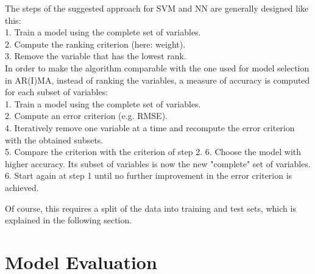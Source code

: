 \documentclass[a4paper, 11pt]{article}
\begin{document}
The steps of the suggested approach for SVM and NN are generally designed like this:\\
1. Train a model using the complete set of variables.\\
2. Compute the ranking criterion (here: weight). \\
3. Remove the variable that has the lowest rank. \\

In order to make the algorithm comparable with the one used for model selection in AR(I)MA, instead of ranking the variables, a measure of accuracy is computed for each subset of variables: \\
1. Train a model using the complete set of variables.\\
2. Compute an error criterion (e.g. RMSE). \\
4. Iteratively remove one variable at a time and recompute the error criterion with the obtained subsets. \\
5. Compare the criterion with the criterion of step 2.
6. Choose the model with higher accuracy. Its subset of variables is now the new "complete" set of variables.\\
6. Start again at step 1 until no further improvement in the error criterion is achieved.

Of course, this requires a split of the data into training and test sets, which is explained in the following section.


\section{Model Evaluation}
\end{document}
